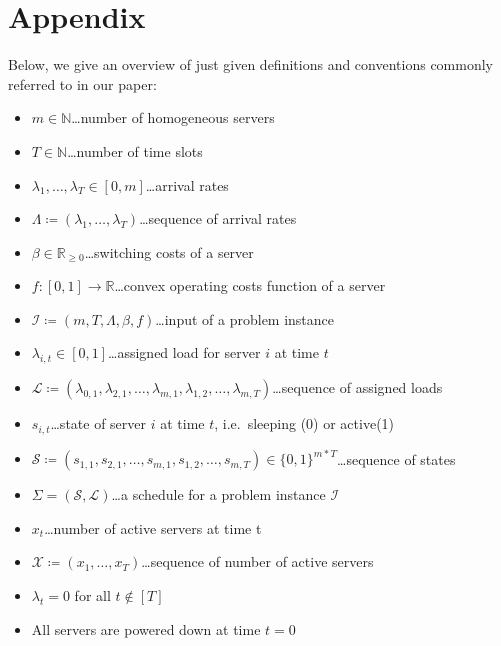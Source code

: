 \documentclass[hidelinks]{article}
\theoremstyle{plain}
\theoremstyle{definition}
\theoremstyle{rem}
\newcommand{\mx}{\mathcal{X}}
\newcommand{\inp}{\mathcal{I}}
\begin{document}
\newpage


\newpage

\section*{Appendix}
Below, we give an overview of just given definitions and conventions commonly referred to in our paper:
\begin{itemize}
	\item $m\in\mathbb{N}$\ldots number of homogeneous servers
	\item $T\in\mathbb{N}$\ldots number of time slots
	\item $\lambda_1,\ldots,\lambda_{T}\in[0,m]$\ldots arrival rates
	\item $\Lambda\coloneqq(\lambda_1,\ldots,\lambda_T)$\ldots sequence of arrival rates
	\item $\beta\in\mathbb{R}_{\ge 0}$\ldots switching costs of a server
	\item $f:[0,1]\rightarrow\mathbb{R}$\ldots convex operating costs function of a server
	\item $\inp\coloneqq(m,T,\Lambda,\beta,f)$\ldots input of a problem instance
	\item $\lambda_{i,t}\in[0,1]$\ldots assigned load for server $i$ at time $t$
	\item $\mathcal{L}\coloneqq(\lambda_{0,1},\lambda_{2,1},\ldots,\lambda_{m,1},\lambda_{1,2},\ldots,\lambda_{m,T})$\ldots sequence of assigned loads
	\item $s_{i,t}$\ldots state of server $i$ at time $t$, i.e.\ sleeping (0) or active(1)
	\item $\mathcal{S}\coloneqq(s_{1,1},s_{2,1},\ldots,s_{m,1},s_{1,2},\ldots,s_{m,T})\in\{0,1\}^{m*T}$\ldots sequence of states 
	\item $\Sigma=(\mathcal{S},\mathcal{L})$\ldots a schedule for a problem instance $\inp$
	\item $x_t$\ldots number of active servers at time t
	\item $\mx\coloneqq(x_1,\ldots,x_T)$\ldots sequence of number of active servers
	\item $\lambda_{t}=0$ for all $t\notin[T]$
	\item All servers are powered down at time $t=0$
\end{itemize}
\normalsize
\end{document}
